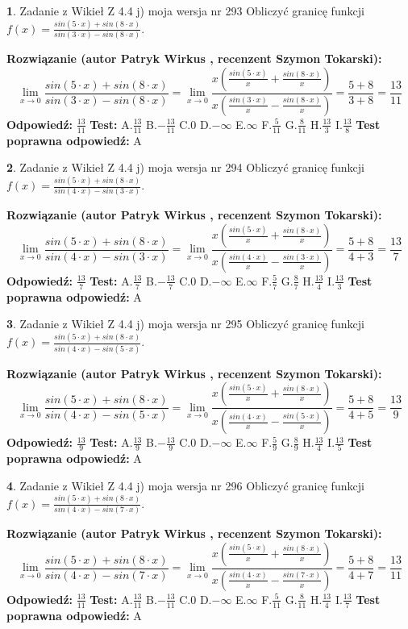 \documentclass[12pt, a4paper]{article}
\theoremstyle{definition} %
\newtheorem{zad}{}
\newcommand{\zadStart}[1]{\begin{zad}#1\newline}
\newcommand{\zadStop}{\end{zad}}
\newcommand{\rozwStart}[2]{\noindent \textbf{Rozwiązanie (autor #1 , recenzent #2): }\newline}
\newcommand{\rozwStop}{\newline}
\newcommand{\odpStart}{\noindent \textbf{Odpowiedź:}\newline}
\newcommand{\odpStop}{\newline}
\newcommand{\testStart}{\noindent \textbf{Test:}\newline}
\newcommand{\testStop}{\newline}
\newcommand{\kluczStart}{\noindent \textbf{Test poprawna odpowiedź:}\newline}
\newcommand{\kluczStop}{\newline}
\begin{document}
\zadStart{Zadanie z Wikieł Z 4.4 j) moja wersja nr 293}
Obliczyć granicę funkcji $f(x)=\frac{sin(5\cdot x) +sin(8\cdot x)}{sin(3\cdot x) -sin(8\cdot x)}$.
\zadStop
\rozwStart{Patryk Wirkus}{Szymon Tokarski}
$$\lim\limits_{x\to 0}\frac{sin(5\cdot x) +sin(8\cdot x)}{sin(3\cdot x) -sin(8\cdot x)}=\lim\limits_{x\to 0}\frac{x(\frac{sin(5\cdot x)}{x}+\frac{sin(8\cdot x)}{x})}{x(\frac{sin(3\cdot x)}{x}-\frac{sin(8\cdot x)}{x})}=\frac{5+8}{3+8} = \frac{13}{11}$$
\rozwStop
\odpStart
$\frac{13}{11}$
\odpStop
\testStart
A.$\frac{13}{11}$
B.$-\frac{13}{11}$
C.$0$
D.$-\infty$
E.$\infty$
F.$\frac{5}{11}$
G.$\frac{8}{11}$
H.$\frac{13}{3}$
I.$\frac{13}{8}$
\testStop
\kluczStart
A
\kluczStop



\zadStart{Zadanie z Wikieł Z 4.4 j) moja wersja nr 294}
Obliczyć granicę funkcji $f(x)=\frac{sin(5\cdot x) +sin(8\cdot x)}{sin(4\cdot x) -sin(3\cdot x)}$.
\zadStop
\rozwStart{Patryk Wirkus}{Szymon Tokarski}
$$\lim\limits_{x\to 0}\frac{sin(5\cdot x) +sin(8\cdot x)}{sin(4\cdot x) -sin(3\cdot x)}=\lim\limits_{x\to 0}\frac{x(\frac{sin(5\cdot x)}{x}+\frac{sin(8\cdot x)}{x})}{x(\frac{sin(4\cdot x)}{x}-\frac{sin(3\cdot x)}{x})}=\frac{5+8}{4+3} = \frac{13}{7}$$
\rozwStop
\odpStart
$\frac{13}{7}$
\odpStop
\testStart
A.$\frac{13}{7}$
B.$-\frac{13}{7}$
C.$0$
D.$-\infty$
E.$\infty$
F.$\frac{5}{7}$
G.$\frac{8}{7}$
H.$\frac{13}{4}$
I.$\frac{13}{3}$
\testStop
\kluczStart
A
\kluczStop



\zadStart{Zadanie z Wikieł Z 4.4 j) moja wersja nr 295}
Obliczyć granicę funkcji $f(x)=\frac{sin(5\cdot x) +sin(8\cdot x)}{sin(4\cdot x) -sin(5\cdot x)}$.
\zadStop
\rozwStart{Patryk Wirkus}{Szymon Tokarski}
$$\lim\limits_{x\to 0}\frac{sin(5\cdot x) +sin(8\cdot x)}{sin(4\cdot x) -sin(5\cdot x)}=\lim\limits_{x\to 0}\frac{x(\frac{sin(5\cdot x)}{x}+\frac{sin(8\cdot x)}{x})}{x(\frac{sin(4\cdot x)}{x}-\frac{sin(5\cdot x)}{x})}=\frac{5+8}{4+5} = \frac{13}{9}$$
\rozwStop
\odpStart
$\frac{13}{9}$
\odpStop
\testStart
A.$\frac{13}{9}$
B.$-\frac{13}{9}$
C.$0$
D.$-\infty$
E.$\infty$
F.$\frac{5}{9}$
G.$\frac{8}{9}$
H.$\frac{13}{4}$
I.$\frac{13}{5}$
\testStop
\kluczStart
A
\kluczStop



\zadStart{Zadanie z Wikieł Z 4.4 j) moja wersja nr 296}
Obliczyć granicę funkcji $f(x)=\frac{sin(5\cdot x) +sin(8\cdot x)}{sin(4\cdot x) -sin(7\cdot x)}$.
\zadStop
\rozwStart{Patryk Wirkus}{Szymon Tokarski}
$$\lim\limits_{x\to 0}\frac{sin(5\cdot x) +sin(8\cdot x)}{sin(4\cdot x) -sin(7\cdot x)}=\lim\limits_{x\to 0}\frac{x(\frac{sin(5\cdot x)}{x}+\frac{sin(8\cdot x)}{x})}{x(\frac{sin(4\cdot x)}{x}-\frac{sin(7\cdot x)}{x})}=\frac{5+8}{4+7} = \frac{13}{11}$$
\rozwStop
\odpStart
$\frac{13}{11}$
\odpStop
\testStart
A.$\frac{13}{11}$
B.$-\frac{13}{11}$
C.$0$
D.$-\infty$
E.$\infty$
F.$\frac{5}{11}$
G.$\frac{8}{11}$
H.$\frac{13}{4}$
I.$\frac{13}{7}$
\testStop
\kluczStart
A
\kluczStop
\end{document}
